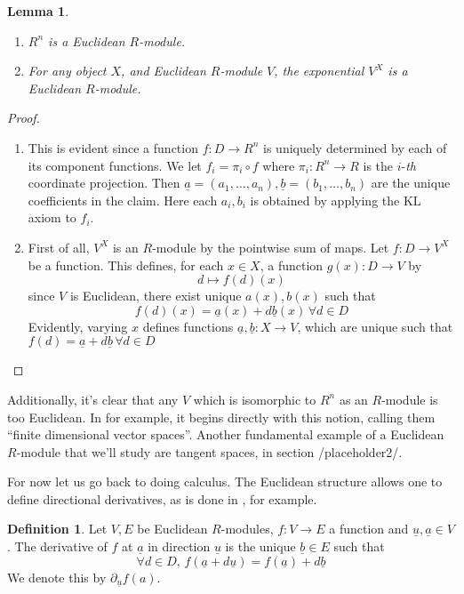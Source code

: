 \documentclass[11pt]{article}
\newtheorem{lemma}{Lemma}[section]
\theoremstyle{definition}
\newtheorem{defn}{Definition}[section]
\renewcommand{\vec}{\underline} %
\numberwithin{equation}{section}
\begin{document}
\begin{lemma}
  \leavevmode
  \begin{enumerate}
    \item \( R^n \) is a Euclidean \( R \)-module.
    \item For any object \( X \), and Euclidean \( R \)-module \( V \), the exponential \( V^X \) is a Euclidean \( R \)-module. 
  \end{enumerate}
  \label{lm:Emod}
\end{lemma}

\begin{proof}
  \leavevmode
  \begin{enumerate}
    \item This is evident since a function \( f:D\to R^n \) is uniquely determined by each of its component functions. We let \( f_i = \pi_i \circ{f}  \) where \( \pi_i:R^n\to R \) is the \( i \)-\textit{th} coordinate projection. Then \( \vec a=(a_1,\dots,a_n), \vec b=(b_1,\dots,b_n) \) are the unique coefficients in the claim. Here each \( a_i,b_i \) is obtained by applying the KL axiom to \( f_i \).
    \item First of all, \( V^X \) is an \( R \)-module by the pointwise sum of maps. Let \( f:D\to V^X \) be a function. This defines, for each \( x\in X \), a function \( g(x):D\to V \) by
    \[
      d\mapsto f(d)(x)
    \]
    since \( V \) is Euclidean, there exist unique \( a(x), b(x) \) such that
    \[
      f(d)(x) = \vec a(x) + d\vec b(x)\,\forall d\in D
    \]
    Evidently, varying \( x \) defines functions \( \vec a,\vec b:X\to V \), which are unique such that \( f(d) = \vec a + d\vec b \,\forall d\in D\)
  \end{enumerate}
\end{proof}

Additionally, it's clear that any \( V \) which is isomorphic to \( R^n \) as an \( R \)-module is too Euclidean. In \cite{kock10} for example, it begins directly with this notion, calling them ``finite dimensional vector spaces''. Another fundamental example of a Euclidean \( R \)-module that we'll study are tangent spaces, in section {/placeholder2/}.

For now let us go back to doing calculus. The Euclidean structure allows one to define directional derivatives, as is done in \cite{lav96}, for example.
\begin{defn}
  Let \( V,E \) be Euclidean \( R \)-modules, \( f:V\to E \) a function and \( \vec u, \vec a\in V \). The derivative of \( f \) at \( \vec a \) in direction \( \vec u \) is the unique \( \vec b\in E \) such that
  \[
    \forall d\in D,\, f(\vec a + d\vec u) = f(\vec a) + d\vec b
  \]
  We denote this by \( \partial_{\vec u}f(a) \). 
\end{defn}
\end{document}
